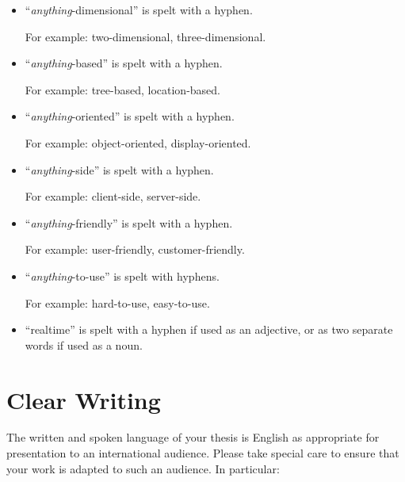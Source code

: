 \begin{itemize}
\item \enquote{\emph{anything}-dimensional} is spelt with a hyphen.

For example: two-dimensional, three-dimensional.



\item \enquote{\emph{anything}-based} is spelt with a hyphen.

For example: tree-based, location-based.



\item \enquote{\emph{anything}-oriented} is spelt with a hyphen.

For example: object-oriented, display-oriented.


\item \enquote{\emph{anything}-side} is spelt with a hyphen.

For example: client-side, server-side.


\item \enquote{\emph{anything}-friendly} is spelt with a hyphen.

For example: user-friendly, customer-friendly.


\item \enquote{\emph{anything}-to-use} is spelt with hyphens.

For example: hard-to-use, easy-to-use.



\item \enquote{realtime} is spelt with a hyphen if used as
  an adjective, or as two separate words if used as a noun.



\end{itemize}












\section{Clear Writing}
\label{sec:Clear}

The written and spoken language of your thesis is English as
appropriate for presentation to an international audience. Please take
special care to ensure that your work is adapted to such an audience.
In particular:

